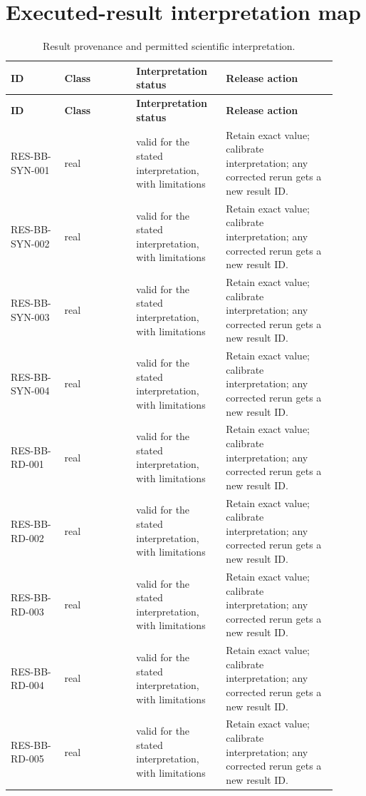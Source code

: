 \section{Executed-result interpretation map}
\small
\begin{longtable}{@{}p{0.15\linewidth}p{0.20\linewidth}p{0.25\linewidth}p{0.31\linewidth}@{}}
\caption{Result provenance and permitted scientific interpretation.}\label{tab:handoff-results}\\
\toprule
\textbf{ID} & \textbf{Class} & \textbf{Interpretation status} & \textbf{Release action}\\
\midrule
\endfirsthead
\toprule
\textbf{ID} & \textbf{Class} & \textbf{Interpretation status} & \textbf{Release action}\\
\midrule
\endhead
RES-BB-SYN-001 & real & valid for the stated interpretation, with limitations & Retain exact value; calibrate interpretation; any corrected rerun gets a new result ID. \\
RES-BB-SYN-002 & real & valid for the stated interpretation, with limitations & Retain exact value; calibrate interpretation; any corrected rerun gets a new result ID. \\
RES-BB-SYN-003 & real & valid for the stated interpretation, with limitations & Retain exact value; calibrate interpretation; any corrected rerun gets a new result ID. \\
RES-BB-SYN-004 & real & valid for the stated interpretation, with limitations & Retain exact value; calibrate interpretation; any corrected rerun gets a new result ID. \\
RES-BB-RD-001 & real & valid for the stated interpretation, with limitations & Retain exact value; calibrate interpretation; any corrected rerun gets a new result ID. \\
RES-BB-RD-002 & real & valid for the stated interpretation, with limitations & Retain exact value; calibrate interpretation; any corrected rerun gets a new result ID. \\
RES-BB-RD-003 & real & valid for the stated interpretation, with limitations & Retain exact value; calibrate interpretation; any corrected rerun gets a new result ID. \\
RES-BB-RD-004 & real & valid for the stated interpretation, with limitations & Retain exact value; calibrate interpretation; any corrected rerun gets a new result ID. \\
RES-BB-RD-005 & real & valid for the stated interpretation, with limitations & Retain exact value; calibrate interpretation; any corrected rerun gets a new result ID. \\

\end{longtable}
